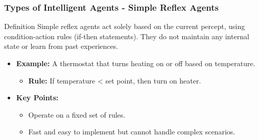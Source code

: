 \documentclass[aspectratio=169]{beamer}
\begin{document}
\begin{frame}[fragile]
    \frametitle{Types of Intelligent Agents - Simple Reflex Agents}
    \begin{block}{Definition}
        Simple reflex agents act solely based on the current percept, using condition-action rules (if-then statements). They do not maintain any internal state or learn from past experiences.
    \end{block}
    
    \begin{itemize}
        \item \textbf{Example:} A thermostat that turns heating on or off based on temperature. 
        \begin{itemize}
            \item \textbf{Rule:} If temperature < set point, then turn on heater.
        \end{itemize}
        \item \textbf{Key Points:}
        \begin{itemize}
            \item Operate on a fixed set of rules.
            \item Fast and easy to implement but cannot handle complex scenarios.
        \end{itemize}
    \end{itemize}
\end{frame}
\end{document}
